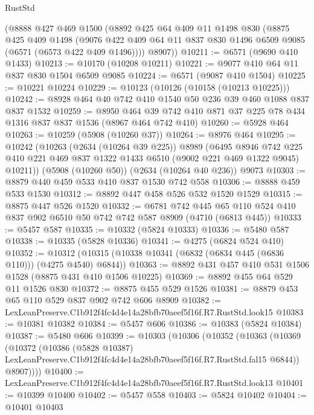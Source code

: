 \begin{lexlean}{RustStd}
\begin{coremodule}
    (@8888
      @427
      @469
      @1500
      (@8892
        @425
        @64
        @409
        @11
        @1498
        @830
        (@8875
          @425
          @409
          @1498
          (@9076 @422 @409 @64 @11 @837 @830 @1496 @6509 @9085 (@6571 (@6573 @422 @409 @1496))))
        @8907))
@10211 := @6571 (@9690 @410 @1433)
@10213 := @10170 (@10208 @10211)
@10221 := @9077 @410 @64 @11 @837 @830 @1504 @6509 @9085
@10224 := @6571 (@9087 @410 @1504)
@10225 := @10221 @10224
@10229 := @10123 (@10126 (@10158 (@10213 @10225)))
@10242 := @8928 @464 @40 @742 @410 @1540 @50 @236 @39 @460 @1088 @837 @837 @1532
@10259 := @8950
    @464
    @39
    @742
    @410
    @871
    @37
    @225
    @78
    @434
    @1316
    @837
    @837
    @1536
    (@8967 @464 @742 @410)
@10260 := @5928 @464
@10263 := @10259 (@5908 (@10260 @37))
@10264 := @8976 @464
@10295 := @10242
    (@10263
      (@2634 (@10264 @39 @225))
      @8989
      (@6495
        @8946
        @742
        @225
        @410
        @221
        @469
        @837
        @1322
        @1433
        @6510
        (@9002 @221 @469 @1322 @9045)
        @10211))
    (@5908 (@10260 @50))
    (@2634 (@10264 @40 @236))
    @9073
@10303 := @8879 @440 @459 @533 @410 @837 @1530 @742 @558
@10306 := @8888 @459 @533 @1530
@10312 := @8892 @447 @458 @526 @532 @1520 @1529
@10315 := @8875 @447 @526 @1520
@10332 := @6781
    @742
    @445
    @65
    @110
    @524
    @410
    @837
    @902
    @6510
    @50
    @742
    @742
    @587
    @8909
    (@4710 (@6813 @445))
@10333 := @5457 @587
@10335 := @10332 (@5824 @10333)
@10336 := @5480 @587
@10338 := @10335 (@5828 @10336)
@10341 := @4275 (@6824 @524 @410)
@10352 := @10312 (@10315 (@10338 @10341 (@6832 (@6834 @445 (@6836 @110))) (@4275 @4540) @6844))
@10363 := @8892 @431 @457 @410 @531 @1506 @1528 (@8875 @431 @410 @1506 @10225)
@10369 := @8892 @455 @64 @529 @11 @1526 @830
@10372 := @8875 @455 @529 @1526
@10381 := @8879 @453 @65 @110 @529 @837 @902 @742 @606 @8909
@10382 := LexLeanPreserve.C1b912f4fc4d4e14a28bfb70aeef5f16f.R7.RustStd.look15
@10383 := @10381 @10382
@10384 := @5457 @606
@10386 := @10383 (@5824 @10384)
@10387 := @5480 @606
@10399 := @10303
    (@10306
      (@10352
        (@10363
          (@10369
            (@10372
              (@10386
                (@5828 @10387)
                LexLeanPreserve.C1b912f4fc4d4e14a28bfb70aeef5f16f.R7.RustStd.fal15
                @6844))
            @8907))))
@10400 := LexLeanPreserve.C1b912f4fc4d4e14a28bfb70aeef5f16f.R7.RustStd.look13
@10401 := @10399 @10400
@10402 := @5457 @558
@10403 := @5824 @10402
@10404 := @10401 @10403

\end{coremodule}
\end{lexlean}

